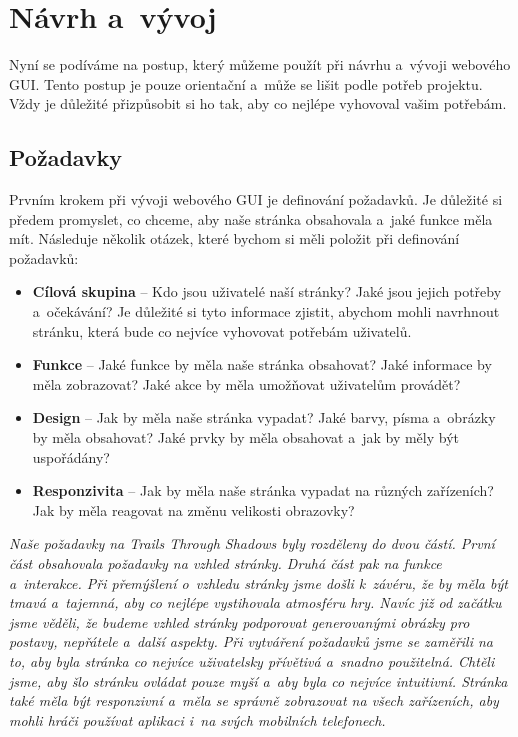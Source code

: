 \section{Návrh a~vývoj}
\label{sec:design-and-development}

Nyní se podíváme na postup, který můžeme použít při návrhu a~vývoji webového GUI. Tento postup je pouze orientační a~může se lišit podle potřeb projektu. Vždy je důležité přizpůsobit si ho tak, aby co nejlépe vyhovoval vašim potřebám.

\subsection{Požadavky}
\label{subsec:requirements}

Prvním krokem při vývoji webového GUI je definování požadavků. Je důležité si předem promyslet, co chceme, aby naše stránka obsahovala a~jaké funkce měla mít. Následuje několik otázek, které bychom si měli položit při definování požadavků:

\begin{itemize}
  \item \textbf{Cílová skupina} -- Kdo jsou uživatelé naší stránky? Jaké jsou jejich potřeby a~očekávání? Je důležité si tyto informace zjistit, abychom mohli navrhnout stránku, která bude co nejvíce vyhovovat potřebám uživatelů.
  \item \textbf{Funkce} -- Jaké funkce by měla naše stránka obsahovat? Jaké informace by měla zobrazovat? Jaké akce by měla umožňovat uživatelům provádět?
  \item \textbf{Design} -- Jak by měla naše stránka vypadat? Jaké barvy, písma a~obrázky by měla obsahovat? Jaké prvky by měla obsahovat a~jak by měly být uspořádány?
  \item \textbf{Responzivita} -- Jak by měla naše stránka vypadat na různých zařízeních? Jak by měla reagovat na změnu velikosti obrazovky?
\end{itemize}

\textit{Naše požadavky na Trails Through Shadows byly rozděleny do dvou částí. První část obsahovala požadavky na vzhled stránky. Druhá část pak na funkce a~interakce. Při přemýšlení o~vzhledu stránky jsme došli k~závéru, že by měla být tmavá a~tajemná, aby co nejlépe vystihovala atmosféru hry. Navíc již od začátku jsme věděli, že budeme vzhled stránky podporovat generovanými obrázky pro postavy, nepřátele a~další aspekty. Při vytváření požadavků jsme se zaměřili na to, aby byla stránka co nejvíce uživatelsky přívětivá a~snadno použitelná. Chtěli jsme, aby šlo stránku ovládat pouze myší a~aby byla co nejvíce intuitivní. Stránka také měla být responzivní a~měla se správně zobrazovat na všech zařízeních, aby mohli hráči používat aplikaci i~na svých mobilních telefonech.}

